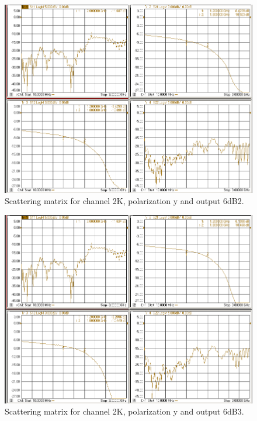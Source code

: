 \documentclass[12pt,a4paper,oneside]{article}
\begin{document}
\begin{figure}[H]
\centering
\includegraphics[width=0.9\linewidth]{VNA_results/2Ky_6dB2.png}
\caption{Scattering matrix for channel 2K, polarization y and output 6dB2.}
\label{fig:2Ky_6dB2}
\end{figure}


\begin{figure}[H]
\centering
\includegraphics[width=0.9\linewidth]{VNA_results/2Ky_6dB3.png}
\caption{Scattering matrix for channel 2K, polarization y and output 6dB3.}
\label{fig:2Ky_6dB3}
\end{figure}
\end{document}
